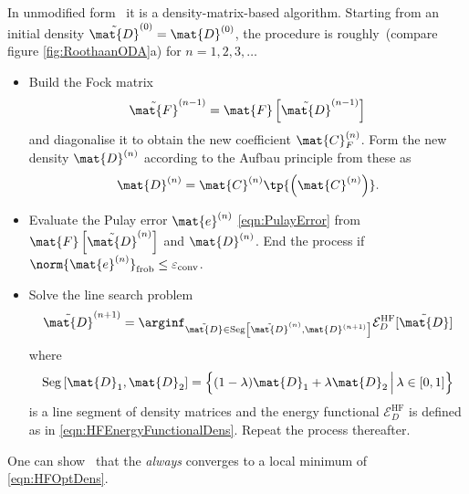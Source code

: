 In unmodified form~\cite{Cances2000,Cances2000a} it is a density-matrix-based \SCF algorithm.
Starting from an initial density $\tilde{\mat{D}}^{(0)} = \mat{D}^{(0)}$,
the procedure is roughly~(compare figure \ref{fig:RoothaanODA}a)
for $n=1, 2, 3, \ldots$
\begin{itemize}
	\item Build the Fock matrix
	\begin{equation}
	\tilde{\mat{F}}^{(n-1)} = \mat{F}\left[ \tilde{\mat{D}}^{(n-1)} \right]
		\label{eqn:ODAupFock}
	\end{equation}
	and diagonalise it to obtain the new coefficient $\mat{C}_F^{(n)}$.
	Form the new density $\mat{D}^{(n)}$ according to the Aufbau principle from these
	as
	\[ \mat{D}^{(n)} = \mat{C}^{(n)} \tp{\left( \mat{C}^{(n)} \right)}. \]
	\item Evaluate the Pulay error $\mat{e}^{(n)}$ \eqref{eqn:PulayError}
		from $\mat{F}\left[ \tilde{\mat{D}}^{(n)} \right]$
		and $\mat{D}^{(n)}$.
		End the process if $\norm{\mat{e}^{(n)}}_\text{frob} \leq \epsilonconv$.
	\item Solve the line search problem
		\begin{equation}
			\tilde{\mat{D}}^{(n+1)}
			= \arginf_{\tilde{\mat{D}} \in
			\text{Seg}\left[\tilde{\mat{D}}^{(n)}, \mat{D}^{(n+1)}\right]}
			\mathcal{E}_D^\text{HF}[\tilde{\mat{D}}]
			\label{eqn:ODAupDens}
		\end{equation}
		where
		\[
			\text{Seg}\left[\mat{D}_1, \mat{D}_2\right]
				= \left\{ (1-\lambda) \mat{D}_1 + \lambda \mat{D}_2 \, \Big|\,
				\lambda \in [0,1] \right\}
		\]
		is a line segment of density matrices
		and the energy functional $\mathcal{E}_D^\text{HF}$
		is defined as in \eqref{eqn:HFEnergyFunctionalDens}.
		Repeat the process thereafter.
\end{itemize}
One can show~\cite{Cances2000} that the \ODA
\emph{always} converges to a local minimum of \eqref{eqn:HFOptDens}.

